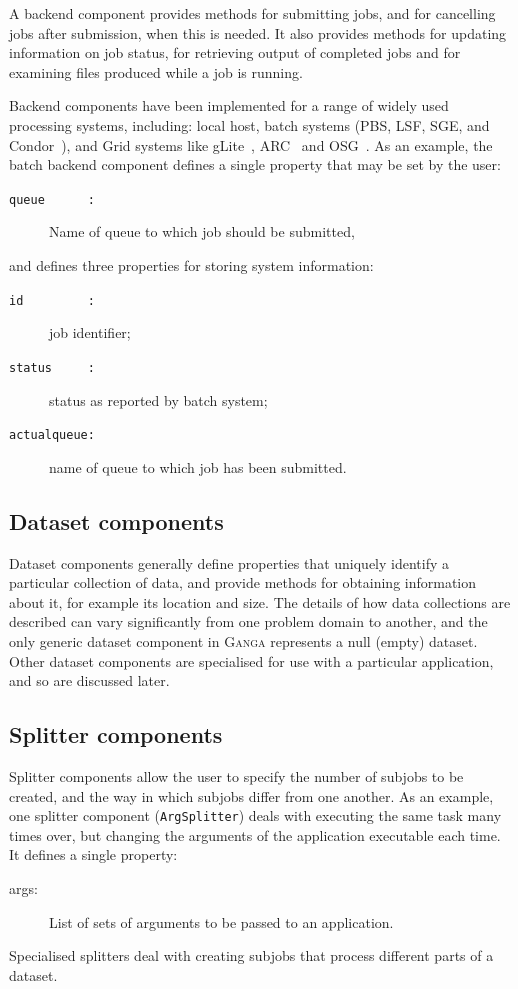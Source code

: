 \documentclass{elsart}
\def\ganga {\textsc{Ganga}\xspace}
\def\grid {Grid\xspace}
\newcommand{\code}[1]{\texttt{#1}}
\begin{document}
A backend component provides methods for submitting jobs, and for cancelling
jobs after submission, when this is needed.  It also provides methods for
updating information on job status, for retrieving output of completed jobs
and for examining files produced while a job is running.

Backend components have been implemented for a range of widely used processing
systems, including: local host, batch systems (PBS, LSF, SGE, and
Condor~\cite{Batch}), and \grid systems like gLite~\cite{LCG},
ARC~\cite{NorduGrid} and OSG~\cite{OSG}.  As an example, the batch backend component defines
a single property that may be set by the user:
\begin{description}
\item[\code{queue~~~~~~:}] Name of queue to which job should be submitted,
\end{description}
and defines three properties for storing system information:
\begin{description}
\item[\code{id~~~~~~~~~:}] job identifier;
\item[\code{status~~~~~:}] status as reported by batch system;
\item[\code{actualqueue:}] name of queue to which job has been submitted.
\end{description}

\subsection{Dataset components}
Dataset components generally define properties that uniquely identify a
particular collection of data, and provide methods for obtaining information
about it, for example its location and size. The details of how data
collections are described can vary significantly from one problem domain to
another, and the only generic dataset component in \ganga represents a null
(empty) dataset.  Other dataset components are specialised for use with a
particular application, and so are discussed later.

\subsection{Splitter components}
Splitter components allow the user to specify the number of subjobs to be
created, and the way in which subjobs differ from one another. As an example,
one splitter component (\code{ArgSplitter}) deals with executing the same task
many times over, but changing the arguments of the application executable each
time. It defines a single property:
\begin{description}
\item[args:] List of sets of arguments to be passed to an application.
\end{description}
Specialised splitters deal with creating subjobs that process different parts
of a dataset.
\end{document}
